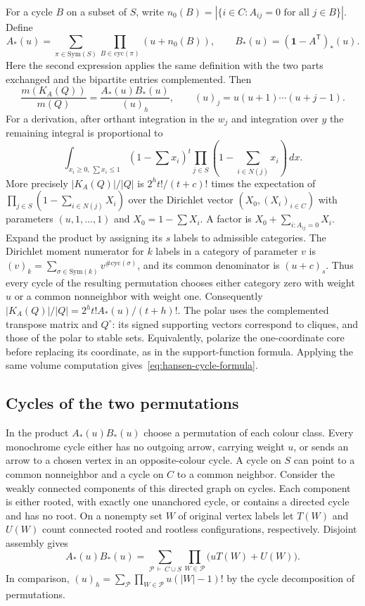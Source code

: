 \documentclass[11pt,a4paper]{article}
\numberwithin{equation}{section}
\begin{document}
For a cycle $B$ on a subset of $S$, write $n_0(B)=|\{i\in C:A_{ij}=0\text{ for all }j\in B\}|$. Define
\[
 A_*(u)=\sum_{\pi\in\mathrm{Sym}(S)}\prod_{B\in\mathrm{cyc}(\pi)}(u+n_0(B)),\qquad
 B_*(u)=(\mathbf1-A^{\mathsf T})_*(u).
\]
Here the second expression applies the same definition with the two parts exchanged and the bipartite entries complemented. Then
\begin{equation}
 \frac{m(K_A(Q))}{m(Q)}=\frac{A_*(u)B_*(u)}{(u)_{h}},\qquad (u)_j=u(u+1)\cdots(u+j-1).
 \label{eq:hansen-cycle-formula}
\end{equation}
For a derivation, after orthant integration in the $w_j$ and integration over $y$ the remaining integral is proportional to
\[
 \int_{x_i\ge0,\,\sum x_i\le1}
 (1-\textstyle\sum x_i)^t\prod_{j\in S}\left(1-\sum_{i\in N(j)}x_i\right)\,dx.
\]
More precisely $|K_A(Q)|/|Q|$ is $2^{h}t!/(t+c)!$ times the expectation of $\prod_{j\in S}(1-\sum_{i\in N(j)}X_i)$ over the Dirichlet vector $(X_0,(X_i)_{i\in C})$ with parameters $(u,1,\ldots,1)$ and $X_0=1-\sum X_i$. A factor is $X_0+\sum_{i:A_{ij}=0}X_i$. Expand the product by assigning its $s$ labels to admissible categories. The Dirichlet moment numerator for $k$ labels in a category of parameter $v$ is $(v)_k=\sum_{\sigma\in\mathrm{Sym}(k)} v^{\#\mathrm{cyc}(\sigma)}$, and its common denominator is $(u+c)_s$. Thus every cycle of the resulting permutation chooses either category zero with weight $u$ or a common nonneighbor with weight one. Consequently $|K_A(Q)|/|Q|=2^h t! A_*(u)/(t+h)!$. The polar uses the complemented transpose matrix and $Q^\circ$: its signed supporting vectors correspond to cliques, and those of the polar to stable sets. Equivalently, polarize the one-coordinate core before replacing its coordinate, as in the support-function formula. Applying the same volume computation gives~\eqref{eq:hansen-cycle-formula}.

\subsection{Cycles of the two permutations}
In the product $A_*(u)B_*(u)$ choose a permutation of each colour class. Every monochrome cycle either has no outgoing arrow, carrying weight $u$, or sends an arrow to a chosen vertex in an opposite-colour cycle. A cycle on $S$ can point to a common nonneighbor and a cycle on $C$ to a common neighbor. Consider the weakly connected components of this directed graph on cycles. Each component is either rooted, with exactly one unanchored cycle, or contains a directed cycle and has no root. On a nonempty set $W$ of original vertex labels let $T(W)$ and $U(W)$ count connected rooted and rootless configurations, respectively. Disjoint assembly gives
\begin{equation}
 A_*(u)B_*(u)=\sum_{\mathcal P\,\vdash\, C\cup S}
 \prod_{W\in\mathcal P}\bigl(uT(W)+U(W)\bigr).
 \label{eq:hansen-components}
\end{equation}
In comparison, $(u)_h=\sum_{\mathcal P}\prod_{W\in\mathcal P}u(|W|-1)!$ by the cycle decomposition of permutations. 
\end{document}
